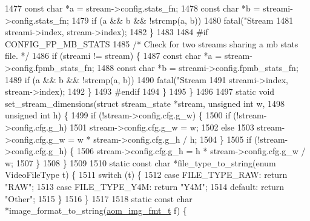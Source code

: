 \begin{DoxyCodeInclude}
{{{{{{{{{{{{{{{{{{{{{{1477       \textcolor{keyword}{const} \textcolor{keywordtype}{char} *a = stream->config.stats\_fn;
1478       \textcolor{keyword}{const} \textcolor{keywordtype}{char} *b = streami->config.stats\_fn;
1479       \textcolor{keywordflow}{if} (a && b && !strcmp(a, b))
1480         fatal(\textcolor{stringliteral}{"Stream %
1481               streami->index, stream->index);
1482     \}
1483 
1484 \textcolor{preprocessor}{#if CONFIG\_FP\_MB\_STATS}
1485     \textcolor{comment}{/* Check for two streams sharing a mb stats file. */}
1486     \textcolor{keywordflow}{if} (streami != stream) \{
1487       \textcolor{keyword}{const} \textcolor{keywordtype}{char} *a = stream->config.fpmb\_stats\_fn;
1488       \textcolor{keyword}{const} \textcolor{keywordtype}{char} *b = streami->config.fpmb\_stats\_fn;
1489       \textcolor{keywordflow}{if} (a && b && !strcmp(a, b))
1490         fatal(\textcolor{stringliteral}{"Stream %
1491               streami->index, stream->index);
1492     \}
1493 \textcolor{preprocessor}{#endif}
1494   \}
1495 \}
1496 
1497 \textcolor{keyword}{static} \textcolor{keywordtype}{void} set\_stream\_dimensions(\textcolor{keyword}{struct} stream\_state *stream, \textcolor{keywordtype}{unsigned} \textcolor{keywordtype}{int} w,
1498                                   \textcolor{keywordtype}{unsigned} \textcolor{keywordtype}{int} h) \{
1499   \textcolor{keywordflow}{if} (!stream->config.cfg.g\_w) \{
1500     \textcolor{keywordflow}{if} (!stream->config.cfg.g\_h)
1501       stream->config.cfg.g\_w = w;
1502     \textcolor{keywordflow}{else}
1503       stream->config.cfg.g\_w = w * stream->config.cfg.g\_h / h;
1504   \}
1505   \textcolor{keywordflow}{if} (!stream->config.cfg.g\_h) \{
1506     stream->config.cfg.g\_h = h * stream->config.cfg.g\_w / w;
1507   \}
1508 \}
1509 
1510 \textcolor{keyword}{static} \textcolor{keyword}{const} \textcolor{keywordtype}{char} *file\_type\_to\_string(\textcolor{keyword}{enum} VideoFileType t) \{
1511   \textcolor{keywordflow}{switch} (t) \{
1512     \textcolor{keywordflow}{case} FILE\_TYPE\_RAW: \textcolor{keywordflow}{return} \textcolor{stringliteral}{"RAW"};
1513     \textcolor{keywordflow}{case} FILE\_TYPE\_Y4M: \textcolor{keywordflow}{return} \textcolor{stringliteral}{"Y4M"};
1514     \textcolor{keywordflow}{default}: \textcolor{keywordflow}{return} \textcolor{stringliteral}{"Other"};
1515   \}
1516 \}
1517 
1518 \textcolor{keyword}{static} \textcolor{keyword}{const} \textcolor{keywordtype}{char} *image\_format\_to\_string(\hyperlink{aom__image_8h_ab71efff8c7f49380fad23b93bc2e9bfc}{aom\_img\_fmt\_t} f) \{
}}}}}}}}}}}}}}}}}}}}}}}}
\end{DoxyCodeInclude}
